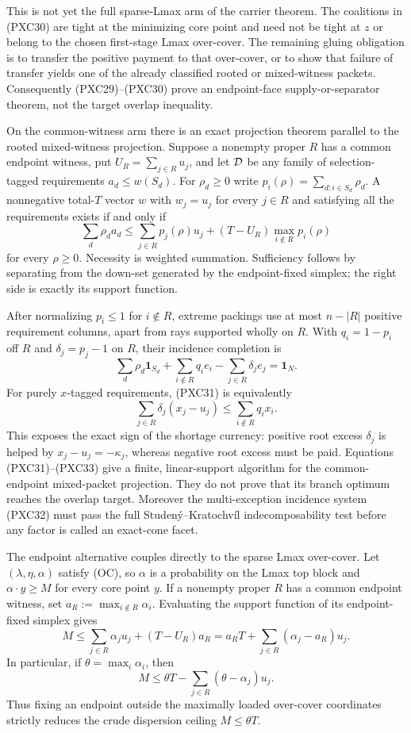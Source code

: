 \documentclass[11pt]{article}
\newcommand{\one}{\mathbf 1}
\begin{document}
This is not yet the full sparse-Lmax arm of the carrier theorem.  The
coalitions in (PXC30) are tight at the minimizing core point and need not be
tight at $z$ or belong to the chosen first-stage Lmax over-cover.  The
remaining gluing obligation is to transfer the positive payment to that
over-cover, or to show that failure of transfer yields one of the already
classified rooted or mixed-witness packets.  Consequently (PXC29)--(PXC30)
prove an endpoint-face supply-or-separator theorem, not the target overlap
inequality.

On the common-witness arm there is an exact projection theorem parallel to
the rooted mixed-witness projection.  Suppose a nonempty proper $R$ has a common endpoint
witness, put $U_R=\sum_{j\in R}u_j$, and let ${\cal D}$ be any family of
selection-tagged requirements $a_d\le w(S_d)$.  For $\rho_d\ge0$ write
$p_i(\rho)=\sum_{d:i\in S_d}\rho_d$.  A nonnegative total-$T$ vector $w$
with $w_j=u_j$ for every $j\in R$ and satisfying all the requirements exists
if and only if
\[
 \sum_d\rho_da_d
 \le \sum_{j\in R}p_j(\rho)u_j
       +(T-U_R)\max_{i\notin R}p_i(\rho)              \tag{PXC31}
\]
for every $\rho\ge0$.  Necessity is weighted summation.  Sufficiency follows
by separating from the down-set generated by the endpoint-fixed simplex;
the right side is exactly its support function.

After normalizing $p_i\le1$ for $i\notin R$, extreme packings use at most
$n-|R|$ positive requirement columns, apart from rays supported wholly on
$R$.  With $q_i=1-p_i$ off $R$ and $\delta_j=p_j-1$ on $R$, their incidence
completion is
\[
 \sum_d\rho_d\one_{S_d}+\sum_{i\notin R}q_ie_i
       -\sum_{j\in R}\delta_je_j=\one_N.             \tag{PXC32}
\]
For purely $x$-tagged requirements, (PXC31) is equivalently
\[
 \sum_{j\in R}\delta_j(x_j-u_j)
       \le\sum_{i\notin R}q_ix_i.                    \tag{PXC33}
\]
This exposes the exact sign of the shortage currency: positive root excess
$\delta_j$ is helped by $x_j-u_j=-\kappa_j$, whereas negative root excess
must be paid.  Equations (PXC31)--(PXC33) give a finite, linear-support
algorithm for the common-endpoint mixed-packet projection.  They do not
prove that its branch optimum reaches the overlap target.  Moreover the
multi-exception incidence system (PXC32) must pass the full
Studen\'y--Kratochv\'il indecomposability test before any factor is called an
exact-cone facet.

The endpoint alternative couples directly to the sparse Lmax over-cover.
Let $(\lambda,\eta,\alpha)$ satisfy (OC), so $\alpha$ is a probability on
the Lmax top block and $\alpha\cdot y\ge M$ for every core point $y$.  If a
nonempty proper $R$ has a common endpoint witness, set
$a_R:=\max_{i\notin R}\alpha_i$.  Evaluating the support function of its
endpoint-fixed simplex gives
\[
 M\le \sum_{j\in R}\alpha_ju_j+(T-U_R)a_R
   =a_RT+\sum_{j\in R}(\alpha_j-a_R)u_j.             \tag{PXC34}
\]
In particular, if $\theta=\max_i\alpha_i$, then
\[
 M\le \theta T-\sum_{j\in R}(\theta-\alpha_j)u_j.   \tag{PXC35}
\]
Thus fixing an endpoint outside the maximally loaded over-cover coordinates
strictly reduces the crude dispersion ceiling $M\le\theta T$.
\end{document}
